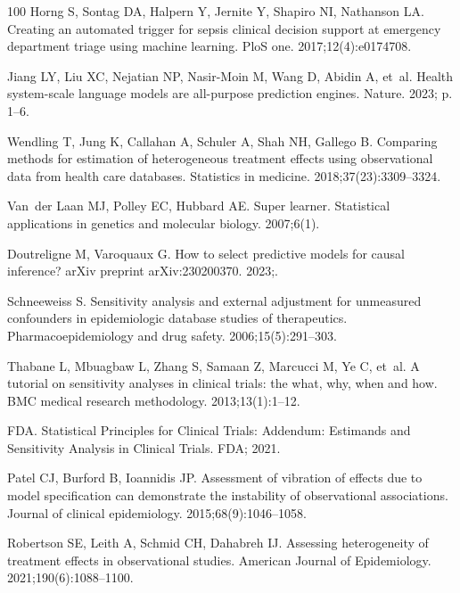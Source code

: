 \documentclass[10pt,letterpaper]{article}
\begin{document}
\begin{thebibliography}{100}
  Horng S, Sontag DA, Halpern Y, Jernite Y, Shapiro NI, Nathanson LA.
  \newblock Creating an automated trigger for sepsis clinical decision support at emergency department triage using machine learning.
  \newblock PloS one. 2017;12(4):e0174708.

  Jiang LY, Liu XC, Nejatian NP, Nasir-Moin M, Wang D, Abidin A, et~al.
  \newblock Health system-scale language models are all-purpose prediction engines.
  \newblock Nature. 2023; p. 1--6.

  Wendling T, Jung K, Callahan A, Schuler A, Shah NH, Gallego B.
  \newblock Comparing methods for estimation of heterogeneous treatment effects using observational data from health care databases.
  \newblock Statistics in medicine. 2018;37(23):3309--3324.

  Van~der Laan MJ, Polley EC, Hubbard AE.
  \newblock Super learner.
  \newblock Statistical applications in genetics and molecular biology. 2007;6(1).

  Doutreligne M, Varoquaux G.
  \newblock How to select predictive models for causal inference?
  \newblock arXiv preprint arXiv:230200370. 2023;.

  Schneeweiss S.
  \newblock Sensitivity analysis and external adjustment for unmeasured confounders in epidemiologic database studies of therapeutics.
  \newblock Pharmacoepidemiology and drug safety. 2006;15(5):291--303.

  Thabane L, Mbuagbaw L, Zhang S, Samaan Z, Marcucci M, Ye C, et~al.
  \newblock A tutorial on sensitivity analyses in clinical trials: the what, why, when and how.
  \newblock BMC medical research methodology. 2013;13(1):1--12.

  FDA.
  \newblock Statistical Principles for Clinical Trials: Addendum: Estimands and Sensitivity Analysis in Clinical Trials.
  \newblock FDA; 2021.

  Patel CJ, Burford B, Ioannidis JP.
  \newblock Assessment of vibration of effects due to model specification can demonstrate the instability of observational associations.
  \newblock Journal of clinical epidemiology. 2015;68(9):1046--1058.

  Robertson SE, Leith A, Schmid CH, Dahabreh IJ.
  \newblock Assessing heterogeneity of treatment effects in observational studies.
  \newblock American Journal of Epidemiology. 2021;190(6):1088--1100.


\end{thebibliography}
\end{document}
